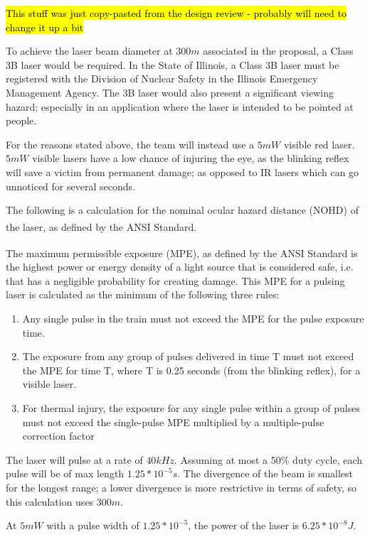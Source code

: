 \documentclass[letterpaper,10pt]{article}
\begin{document}
\begin{spacing}{1.15}
\hl{This stuff was just copy-pasted from the design review - probably will need to change it up a bit}

 To achieve the laser beam diameter at $300 m$ associated in the proposal, a Class 3B laser would be required. In the State of Illinois, a Class 3B laser must be registered with the Division of Nuclear Safety in the Illinois Emergency Management Agency. The 3B laser would also present a significant viewing hazard; especially in an application where the laser is intended to be pointed at people. 
 
 For the reasons stated above, the team will instead use a $5mW$ visible red laser. $5mW$ visible lasers have a low chance of injuring the eye, as the blinking reflex will save a victim from permanent damage; as opposed to IR lasers which can go unnoticed for several seconds. 
 
 The following is a calculation for the nominal ocular hazard distance (NOHD) of the laser, as defined by the ANSI Standard\textsuperscript{\cite{ANSI}}.
 
 The maximum permissible exposure (MPE), as defined by the ANSI Standard \textsuperscript{\cite{ANSI}} is the highest power or energy density of a light source that is considered safe, i.e. that has a negligible probability for creating damage. This MPE for a pulsing laser is calculated as the minimum of the following three rules:
 
 \begin{enumerate}
 	\item Any single pulse in the train must not exceed the MPE for the pulse exposure time.
 	\item The exposure from any group of pulses delivered in time T must not exceed the MPE for
 	time T, where T is 0.25 seconds (from the blinking reflex), for a visible laser. 
 	\item For thermal injury, the exposure for any single pulse within a group of pulses must not
 	exceed the single-pulse MPE multiplied by a multiple-pulse correction factor
 \end{enumerate}
 
 The laser will pulse at a rate of $40 kHz$. Assuming at most a 50\% duty cycle, each pulse will be of max length $1.25*10^{-5} s$. The divergence of the beam is smallest for the longest range; a lower divergence is more restrictive in terms of safety, so this calculation uses $300m$. 
 
 At $5mW$ with a pulse width of $1.25*10^{-5}$, the power of the laser is $6.25*10^{-8} J$. 
 

\end{spacing}
\end{document}
